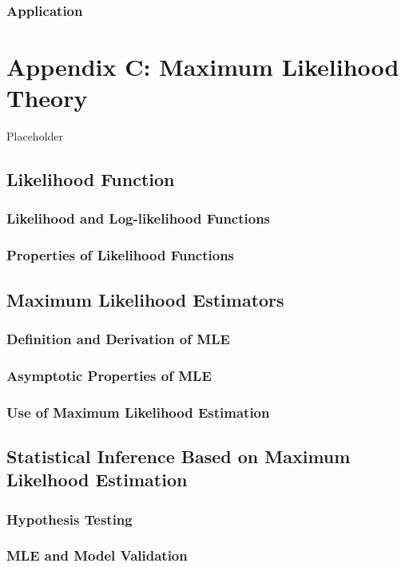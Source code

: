 \documentclass[]{book}
\theoremstyle{definition}
\theoremstyle{definition}
\theoremstyle{definition}
\theoremstyle{remark}
\begin{document}
\subsection{Application}\label{application}

\chapter{Appendix C: Maximum Likelihood Theory}\label{C:AppC}

Placeholder

\section{Likelihood Function}\label{S:AppC:LF}

\subsection{Likelihood and Log-likelihood
Functions}\label{likelihood-and-log-likelihood-functions}

\subsection{Properties of Likelihood
Functions}\label{properties-of-likelihood-functions}

\section{Maximum Likelihood Estimators}\label{S:AppC:MLE}

\subsection{Definition and Derivation of
MLE}\label{definition-and-derivation-of-mle}

\subsection{Asymptotic Properties of
MLE}\label{asymptotic-properties-of-mle}

\subsection{Use of Maximum Likelihood
Estimation}\label{use-of-maximum-likelihood-estimation}

\section{Statistical Inference Based on Maximum Likelhood
Estimation}\label{S:AppC:SI}

\subsection{Hypothesis Testing}\label{hypothesis-testing}

\subsection{MLE and Model Validation}\label{S:AppC:MLEModelVal}


\end{document}
